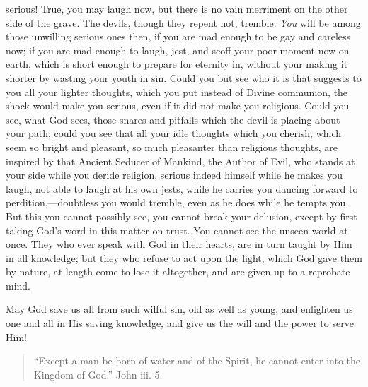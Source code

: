 serious! True, you may laugh now, but there is no vain merriment on
the other side of the grave. The devils, though they repent not,
tremble. \emph{You} will be among those unwilling serious ones then, if you
are mad enough to be gay and careless now; if you are mad enough to
laugh, jest, and scoff your poor moment now on earth, which is short
enough to prepare for eternity in, without your making it shorter by
wasting your youth in sin. Could you but see who it is that suggests
to you all your lighter thoughts, which you put instead of Divine
communion, the shock would make you serious, even if it did not make
you religious. Could you see, what God sees, those snares and pitfalls
which the devil is placing about your path; could you see that all
your idle thoughts which you cherish, which seem so bright and
pleasant, so much pleasanter than religious thoughts, are inspired by
that Ancient Seducer of Mankind, the Author of Evil, who stands at
your side while you deride religion, serious indeed himself while he
makes you laugh, not able to laugh at his own jests, while he carries
you dancing forward to perdition,—doubtless you would tremble, even
as he does while he tempts you. But this you cannot possibly see, you
cannot break your delusion, except by first taking God's word in this
matter on trust. You cannot see the unseen world at once. They who
ever speak with God in their hearts, are in turn taught by Him in all
knowledge; but they who refuse to act upon the light, which God gave
them by nature, at length come to lose it altogether, and are given up
to a reprobate mind.

May God save us all from such wilful sin, old as well as young, and
enlighten us one and all in His saving knowledge, and give us the will
and the power to serve Him!


\begin{quote}

``Except a man be born of water and of the
Spirit, he cannot enter into the Kingdom of
God.''
John iii. 5.

\end{quote}

